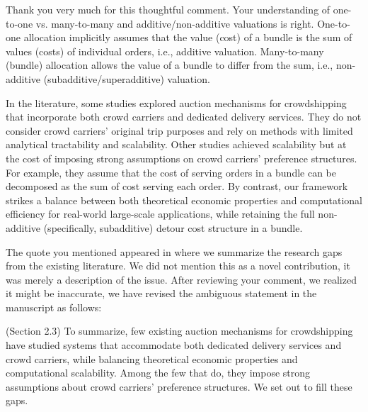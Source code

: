 \begin{revresponse}[1.2]
	Thank you very much for this thoughtful comment. Your understanding of one-to-one vs. many-to-many and additive/non-additive valuations is right. One-to-one allocation implicitly assumes that the value (cost) of a bundle is the sum of values (costs) of individual orders, i.e., additive valuation. Many-to-many (bundle) allocation allows the value of a bundle to differ from the sum, i.e., non-additive (subadditive/superadditive) valuation. 

    In the literature, some studies explored auction mechanisms for crowdshipping that incorporate both crowd carriers and dedicated delivery services. They do not consider crowd carriers' original trip purposes and rely on methods with limited analytical tractability and scalability. Other studies achieved scalability but at the cost of imposing strong assumptions on crowd carriers' preference structures. For example, they assume that the cost of serving orders in a bundle can be decomposed as the sum of cost serving each order. 
    By contrast, our framework strikes a balance between both theoretical economic properties and computational efficiency for real-world large-scale applications, while retaining the full non-additive (specifically, subadditive) detour cost structure in a bundle.

    The quote you mentioned appeared in  where we summarize the research gaps from the existing literature. We did not mention this as a novel contribution, it was merely a description of the issue. 
    After reviewing your comment, we realized it might be inaccurate, we have revised the ambiguous statement in the manuscript as follows:
    \begin{changes}
        (Section 2.3) To summarize, few existing auction mechanisms for crowdshipping have studied systems that accommodate both dedicated delivery services and crowd carriers, while balancing theoretical economic properties and computational scalability. Among the few that do, they impose strong assumptions about crowd carriers' preference structures. We set out to fill these gaps.
    \end{changes}
\end{revresponse}

